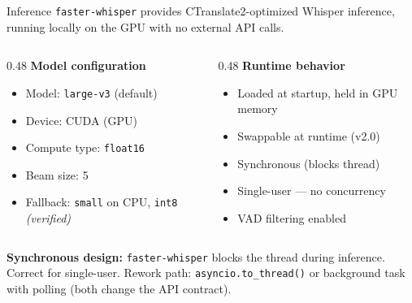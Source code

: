 \documentclass{beamer}
\begin{document}
\begin{frame}{Inference}
    \small
    \texttt{faster-whisper} provides CTranslate2-optimized Whisper inference,
    running locally on the GPU with no external API calls.

    \vspace{0.2em}
    \begin{columns}[T]
        \begin{column}{0.48\textwidth}
            \textbf{Model configuration}
            \begin{itemize}\setlength{\itemsep}{0pt}\setlength{\parskip}{0pt}
                \item Model: \texttt{large-v3} (default)
                \item Device: CUDA (GPU)
                \item Compute type: \texttt{float16}
                \item Beam size: 5
                \item Fallback: \texttt{small} on CPU, \texttt{int8}
                      {\scriptsize\textit{(verified)}}
            \end{itemize}
        \end{column}
        \begin{column}{0.48\textwidth}
            \textbf{Runtime behavior}
            \begin{itemize}\setlength{\itemsep}{0pt}\setlength{\parskip}{0pt}
                \item Loaded at startup, held in GPU memory
                \item Swappable at runtime (v2.0)
                \item Synchronous (blocks thread)
                \item Single-user --- no concurrency
                \item VAD filtering enabled
            \end{itemize}
        \end{column}
    \end{columns}

    \vspace{0.2em}
    {\footnotesize\textbf{Synchronous design:}
    \texttt{faster-whisper} blocks the thread during inference.
    Correct for single-user. Rework path: \texttt{asyncio.to\_thread()}
    or background task with polling (both change the API contract).}\par
\end{frame}
\end{document}
